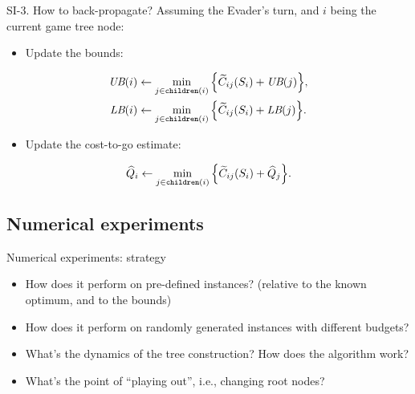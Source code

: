 \documentclass[10pt, xcolor=svgnames]{beamer}
\begin{document}
\begin{frame}[label={sec:org97287ac}]{SI-3. How to back-propagate?}
Assuming the Evader's turn, and \(i\) being the current game tree node:
\begin{itemize}
\item Update the bounds:
\end{itemize}
\begin{align*}
  \UB{i} &\gets \min_{j\in\children{i}} \Big\{ \widetilde{C}_{ij}(S_i) + \UB{j} \Big\},\\
  \LB{i} &\gets \min_{j\in\children{i}} \Big\{ \widetilde{C}_{ij}(S_i) + \LB{j} \Big\}.
\end{align*}

\begin{itemize}
\item Update the cost-to-go estimate:
\end{itemize}
\begin{equation*}
\widehat{Q}_i \gets \min_{j\in\texttt{children}(i)} \Big\{ \widetilde{C}_{ij}(S_i) + \widehat{Q}_j\Big\}.
\end{equation*}
\end{frame}
\subsection{Numerical experiments}
\label{sec:org412346c}
\begin{frame}[label={sec:org6c9ee69}]{Numerical experiments: strategy}
\begin{itemize}
\item How does it perform on pre-defined instances? (relative to the known optimum, and to the bounds)
\item How does it perform on randomly generated instances with different budgets?
\item What's the dynamics of the tree construction? How does the algorithm work?
\item What's the point of ``playing out'', i.e., changing root nodes?
\end{itemize}
\end{frame}
\end{document}
